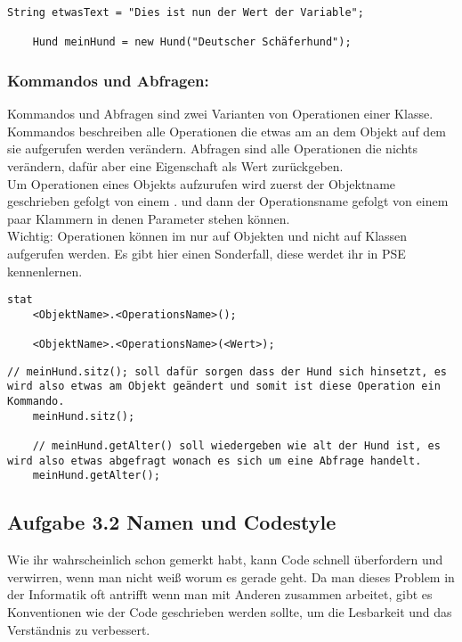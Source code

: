 \begin{lstlisting}[title=\textbf{Variable Beispiel}]
	String etwasText = "Dies ist nun der Wert der Variable";
	
	Hund meinHund = new Hund("Deutscher Schäferhund");
\end{lstlisting}
\begin{Infobox}
	\subsubsection*{Kommandos und Abfragen:}
	Kommandos und Abfragen sind zwei Varianten von Operationen einer Klasse. Kommandos beschreiben alle Operationen die etwas am an dem Objekt auf dem sie aufgerufen werden verändern.
	Abfragen sind alle Operationen die nichts verändern, dafür aber eine Eigenschaft als Wert zurückgeben.\\
	Um Operationen eines Objekts aufzurufen wird zuerst der Objektname geschrieben gefolgt von einem . und dann der Operationsname gefolgt von einem paar Klammern in denen Parameter stehen können.\\
	{\color{red} Wichtig: } Operationen können im nur auf Objekten und nicht auf Klassen aufgerufen werden.
	Es  gibt hier einen Sonderfall, diese werdet ihr in PSE kennenlernen.
\end{Infobox}
\begin{lstlisting}[title=\textbf{Kommando/Abfrage Syntax}]stat
	<ObjektName>.<OperationsName>();
	
	<ObjektName>.<OperationsName>(<Wert>);
\end{lstlisting}
\newpage
\begin{lstlisting}[title=\textbf{Kommando/Abfrage Beispiel}]
	// meinHund.sitz(); soll dafür sorgen dass der Hund sich hinsetzt, es wird also etwas am Objekt geändert und somit ist diese Operation ein Kommando.
	meinHund.sitz();
	
	// meinHund.getAlter() soll wiedergeben wie alt der Hund ist, es wird also etwas abgefragt wonach es sich um eine Abfrage handelt.
	meinHund.getAlter();
\end{lstlisting}

\subsection*{Aufgabe 3.2 Namen und Codestyle}
Wie ihr wahrscheinlich schon gemerkt habt, kann Code schnell überfordern und verwirren, wenn man nicht weiß worum es gerade geht.
Da man dieses Problem in der Informatik oft antrifft wenn man mit Anderen zusammen arbeitet, gibt es Konventionen wie der Code geschrieben werden sollte, um die Lesbarkeit und das Verständnis zu verbessert.

